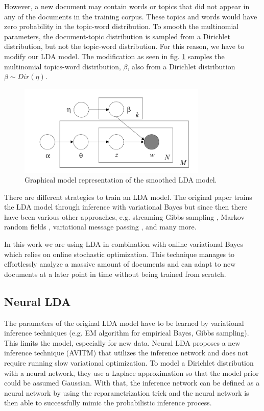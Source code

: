 However, a new document may contain words or topics that did not appear in any of the documents in the training corpus. These topics and words would have zero probability in the topic-word distribution. To smooth the multinomial parameters, the document-topic distribution is sampled from a Dirichlet distribution, but not the topic-word distribution. For this reason, we have to modify our LDA model. The modification as seen in fig. \ref{fig:lda_smooth} samples the multinomial topics-word distribution, $\beta$, also from a Dirichlet distribution $\beta\sim Dir(\eta)$.
\begin{figure}[H]
    \centering
    \includegraphics[width=0.8\textwidth]{figures/lda_smooth}
    \caption{Graphical model representation of the smoothed LDA model. \cite{blei2003latent}}
    \label{fig:lda_smooth}
\end{figure}
There are different strategies to train an LDA model. The original paper trains the LDA model through inference with variational Bayes \cite{blei2003latent} but since then there have been various other approaches, e.g. streaming Gibbs sampling \cite{gao2016streaming}, Markov random fields \cite{he2019end}, variational message passing \cite{taylor2021variational}, and many more.

In this work we are using LDA in combination with online variational Bayes \cite{hoffman2010online} which relies on online stochastic optimization. This technique manages to effortlessly analyze a massive amount of documents and can adapt to new documents at a later point in time without being trained from scratch.

\subsection{Neural LDA}
The parameters of the original LDA model have to be learned by variational inference techniques (e.g. EM algorithm for empirical Bayes, Gibbs sampling). This limits the model, especially for new data. Neural LDA proposes a new inference technique (AVITM) \cite{neuralLDA} that utilizes the inference network and does not require running slow variational optimization. To model a Dirichlet distribution with a neural network, they use a Laplace approximation \cite{mackay1998choice} so that the model prior could be assumed Gaussian. With that, the inference network can be defined as a neural network by using the reparametrization trick \cite{kingma2013auto} and the neural network is then able to successfully mimic the probabilistic inference process.  

